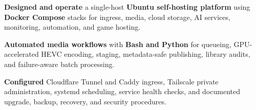\begin{bullets}
    \item \textbf{Designed and operate} a single-host \textbf{Ubuntu self-hosting platform} using \textbf{Docker Compose} stacks for ingress, media, cloud storage, AI services, monitoring, automation, and game hosting.
    \item \textbf{Automated media workflows} with \textbf{Bash and Python} for queueing, GPU-accelerated HEVC encoding, staging, metadata-safe publishing, library audits, and failure-aware batch processing.
    \item \textbf{Configured} Cloudflare Tunnel and Caddy ingress, Tailscale private administration, systemd scheduling, service health checks, and documented upgrade, backup, recovery, and security procedures.
\end{bullets}
